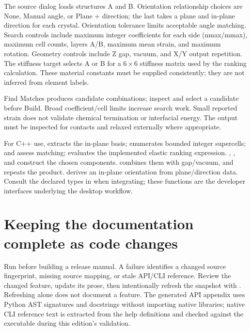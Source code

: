 The source dialog loads structures A and B. Orientation relationship choices are None, Manual angle, or Plane + direction; the last takes a plane and in-plane direction for each crystal. Orientation tolerance limits acceptable angle matching. Search controls include maximum integer coefficients for each side (nmax/mmax), maximum cell counts, layers A/B, maximum mean strain, and maximum rotation. Geometry controls include Z gap, vacuum, and X/Y output repetition. The stiffness target selects A or B for a $6\times6$ stiffness matrix used by the ranking calculation. These material constants must be supplied consistently; they are not inferred from element labels.

Find Matches produces candidate combinations; inspect and select a candidate before Build. Broad coefficient/cell limits increase search work. Small reported strain does not validate chemical termination or interfacial energy. The output must be inspected for contacts and relaxed externally where appropriate.

For C++ use,  extracts the in-plane basis;  enumerates bounded integer supercells;  and  assess matching;  evaluates the implemented elastic ranking expression. , , and  construct the chosen components.  combines them with gap/vacuum, and  repeats the product.  derives an in-plane orientation from plane/direction data. Consult the declared types in  when integrating; these functions are the developer interfaces underlying the desktop workflow.

\section{Keeping the documentation complete as code changes}
Run  before building a release manual. A failure identifies a changed source fingerprint, missing source mapping, or stale API/CLI reference. Review the changed feature, update its prose, then intentionally refresh the snapshot with . Refreshing alone does not document a feature. The generated API appendix uses Python AST signatures and docstrings without importing native libraries; native CLI reference text is extracted from the help definitions and checked against the executable during this edition's validation.
